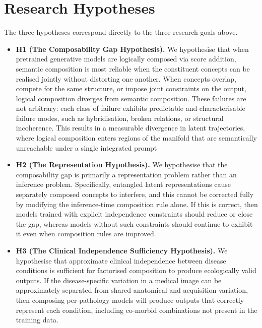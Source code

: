 \section{Research Hypotheses}
\label{sec:research_objectives_research_hypothesis}

The three hypotheses correspond directly to the three research goals above.

\begin{itemize}

    \item \textbf{H1 (The Composability Gap Hypothesis).}
    We hypothesise that when pretrained generative models are logically composed via score addition, semantic composition is most reliable when the constituent concepts can be realised jointly without distorting one another. 
    When concepts overlap, compete for the same structure, or impose joint constraints on the output, logical composition diverges from semantic composition.
    These failures are not arbitrary: each class of failure exhibits predictable and characterisable failure modes, such as hybridisation, broken relations, or structural incoherence. 
    This results in a measurable divergence in latent trajectories, where logical composition enters regions of the manifold that are semantically unreachable under a single integrated prompt

    \item \textbf{H2 (The Representation Hypothesis).}
    We hypothesise that the composability gap is primarily a representation problem
    rather than an inference problem.
    Specifically, entangled latent representations cause separately composed concepts
    to interfere, and this cannot be corrected fully by modifying the inference-time
    composition rule alone.
    If this is correct, then models trained with explicit independence constraints
    should reduce or close the gap, whereas models without such constraints should
    continue to exhibit it even when composition rules are improved.

    \item \textbf{H3 (The Clinical Independence Sufficiency Hypothesis).}
    We hypothesise that approximate clinical independence between disease conditions
    is sufficient for factorised composition to produce ecologically valid outputs.
    If the disease-specific variation in a medical image can be approximately separated
    from shared anatomical and acquisition variation, then composing per-pathology
    models will produce outputs that correctly represent each condition, including
    co-morbid combinations not present in the training data.

\end{itemize}
